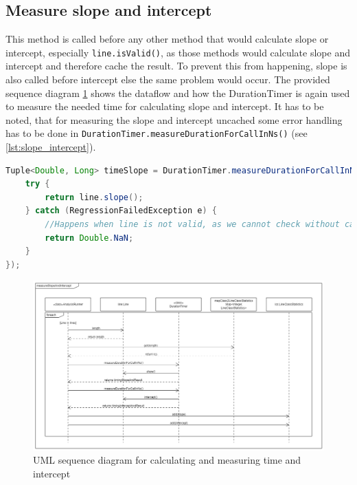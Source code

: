 \subsection{Measure slope and intercept}
This method is called before any other method that would calculate slope or intercept, especially \texttt{line.isValid()}, as those methods would calculate slope and intercept and therefore cache the result. To prevent this from happening, slope is also called before intercept else the same problem would occur. The provided sequence diagram \ref{fig:seq_slope_intercept} shows the dataflow and how the DurationTimer is again used to measure the needed time for calculating slope and intercept. It has to be noted, that for measuring the slope and intercept uncached some error handling has to be done in \texttt{DurationTimer.measureDurationForCallInNs()} (see \ref{lst:slope_intercept}).

\begin{lstlisting}[language=java, caption=Error handling in supplier for unchaced slope and intercept, label=lst:slope_intercept]
Tuple<Double, Long> timeSlope = DurationTimer.measureDurationForCallInNs(()-> {
    try {
        return line.slope();
    } catch (RegressionFailedException e) {
        //Happens when line is not valid, as we cannot check without caching slope and intercept
        return Double.NaN;
    }
});
\end{lstlisting}

\begin{landscape}
    \begin{figure}
        \begin{center}
            \includegraphics[width=1.75\textwidth, height=0.99\textheight]{img/seq_slope_intercept.png}
            \caption{UML sequence diagram for calculating and measuring time and intercept}
            \label{fig:seq_slope_intercept}
        \end{center}
    \end{figure}
\end{landscape}

